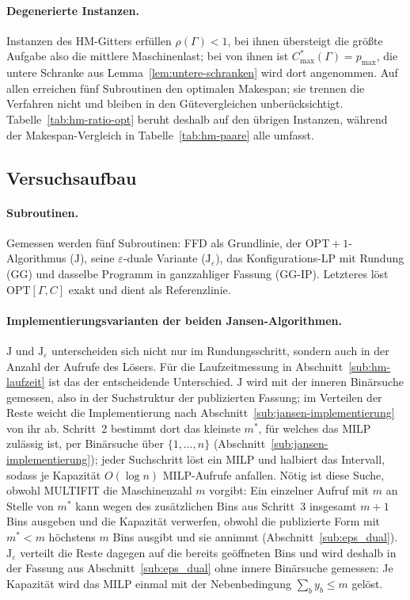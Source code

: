 \paragraph{Degenerierte Instanzen.}
\HmDegeneriert{} Instanzen des HM-Gitters erfüllen $\rho(\Gamma) < 1$, bei ihnen übersteigt die
größte Aufgabe also die mittlere Maschinenlast; bei \HmDegOptPMax{} von ihnen ist
$C^{*}_{\max}(\Gamma) = p_{\max}$, die untere Schranke aus Lemma~\ref{lem:untere-schranken} wird
dort angenommen.
Auf allen \HmDegeneriert{} erreichen \HmDegAlleOptimal{} fünf Subroutinen den optimalen
Makespan; sie trennen die Verfahren nicht und bleiben in den Gütevergleichen unberücksichtigt.
Tabelle~\ref{tab:hm-ratio-opt} beruht deshalb auf den übrigen Instanzen, während der
Makespan-Vergleich in Tabelle~\ref{tab:hm-paare} alle \HmInstanzen{} umfasst.

\subsection{Versuchsaufbau}
\label{sub:hm-aufbau}

\paragraph{Subroutinen.}
Gemessen werden fünf Subroutinen: FFD als Grundlinie, der $\mathrm{OPT}+1$-Algorithmus ($\mathrm{J}$), seine
$\varepsilon$-duale Variante ($\mathrm{J}_\varepsilon$), das Konfigurations-LP mit Rundung
($\mathrm{GG}$) und dasselbe Programm in ganzzahliger Fassung ($\mathrm{GG}$-IP).
Letzteres löst $\mathrm{OPT}[\Gamma, C]$ exakt und dient als Referenzlinie.

\paragraph{Implementierungsvarianten der beiden Jansen-Algorithmen.}
$\mathrm{J}$ und $\mathrm{J}_\varepsilon$ unterscheiden sich nicht nur im Rundungsschritt,
sondern auch in der Anzahl der Aufrufe des Lösers.
Für die Laufzeitmessung in Abschnitt~\ref{sub:hm-laufzeit} ist das der entscheidende
Unterschied.
$\mathrm{J}$ wird mit der inneren Binärsuche gemessen, also in der Suchstruktur der
publizierten Fassung; im Verteilen der Reste weicht die Implementierung nach
Abschnitt~\ref{sub:jansen-implementierung} von ihr ab.
Schritt~2 bestimmt dort das kleinste $m^*$, für welches das MILP zulässig ist, per Binärsuche über
$\{1, \ldots, n\}$ (Abschnitt~\ref{sub:jansen-implementierung}); jeder Suchschritt löst ein MILP
und halbiert das Intervall, sodass je Kapazität $O(\log n)$ MILP-Aufrufe anfallen.
Nötig ist diese Suche, obwohl MULTIFIT die Maschinenzahl $m$ vorgibt: Ein einzelner Aufruf mit
$m$ an Stelle von $m^*$ kann wegen des zusätzlichen Bins aus Schritt~3 insgesamt $m+1$ Bins
ausgeben und die Kapazität verwerfen, obwohl die publizierte Form mit $m^* < m$ höchstens $m$
Bins ausgibt und sie annimmt (Abschnitt~\ref{sub:eps_dual}).
$\mathrm{J}_\varepsilon$ verteilt die Reste dagegen auf die bereits geöffneten Bins und wird
deshalb in der Fassung aus Abschnitt~\ref{sub:eps_dual} ohne innere Binärsuche gemessen: Je
Kapazität wird das MILP einmal mit der Nebenbedingung $\sum_b y_b \le m$ gelöst.

